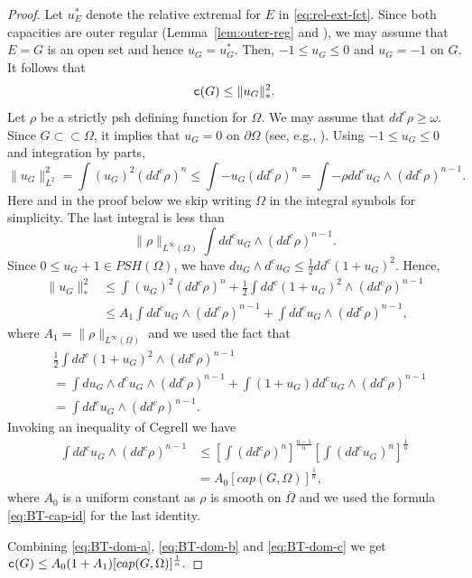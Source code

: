 \documentclass{amsart}
\renewcommand{\d}{\partial}
\newcommand{\om}{\omega}
\newcommand{\tc}{{\tt c}}
\newcommand{\Om}{\Omega}
\theoremstyle{definition}
\numberwithin{thm}{section}
\numberwithin{equation}{section}
\renewcommand{\[}{\begin{equation}}
\renewcommand{\]}{\end{equation}}
\newcommand{\wed}{\wedge}
\begin{document}
\begin{proof} Let  $u_E^*$ denote  the relative extremal for $E$ in \eqref{eq:rel-ext-fct}.
Since both capacities are outer regular (Lemma~\ref{lem:outer-reg} and \cite{BT82}), we may assume that $E=G$ is an open set and hence $u_G = u_G^*$. Then, $-1\leq u_G \leq 0$ and $u_G =-1$ on $G$.  It follows that
\[\label{eq:BT-dom-a}
	\tc(G) \leq \|u_G\|_*^2.
\]
Let $\rho$ be a strictly psh defining function for $\Om$. We may assume that $dd^c \rho \geq \om$. Since $G\subset \subset \Om$, it implies that $u_G =0$ on $\d\Om$ (see, e.g., \cite[Properties (13.11)]{De89}). Using  $-1 \leq u_G \leq 0$ and integration by parts,
$$
	\|u_G\|_{L^2}^2 = \int  (u_G)^2 (dd^c \rho)^n \leq \int - u_G (dd^c\rho)^n = \int -\rho dd^c u_G \wed (dd^c\rho)^{n-1}.
$$
Here and in the proof below we skip writing $\Om$ in the integral symbols 
for simplicity. The last integral is less than 
$$
	\|\rho\|_{L^\infty(\Om)} \int dd^c u_G \wed (dd^c\rho)^{n-1}.
$$
Since $0\leq u_G+1 \in PSH(\Om)$, we have
$d u_G \wed d^c u_G \leq \frac{1}{2} dd^c (1+u_G)^2.$
Hence, 
\[\label{eq:BT-dom-b}\begin{aligned}
	\|u_G\|_*^2 
&\leq \int (u_G)^2 (dd^c \rho)^n + \frac{1}{2}\int dd^c (1+u_G)^2 \wed (dd^c \rho)^{n-1} \\
&\leq A_1 \int dd^c u_G \wed (dd^c\rho)^{n-1} + \int dd^c u_G \wed (dd^c \rho)^{n-1},
\end{aligned}\]
where $A_1 = \|\rho\|_{L^\infty(\Om)}$ and we used the fact that 
$$\begin{aligned}
&	\frac{1}{2}\int dd^c (1+u_G)^2 \wed (dd^c \rho)^{n-1} \\
&=\int du_G \wed d^c u_G \wed (dd^c\rho)^{n-1} + \int (1+u_G) dd^c u_G \wed (dd^c \rho)^{n-1} \\
	&=	\int dd^c u_G \wed (dd^c \rho)^{n-1}.
\end{aligned}
$$
Invoking an inequality of Cegrell  \cite{Ce04} we have
\[\label{eq:BT-dom-c}\begin{aligned}
	\int dd^c u_G \wed (dd^c \rho)^{n-1}& \leq \left[\int (dd^c\rho)^n\right]^\frac{n-1}{n} \left[\int (dd^c u_G)^n\right]^\frac{1}{n} \\ &=  A_0 [cap(G,\Om)]^\frac{1}{n},
\end{aligned}\]
where $A_0$ is a uniform constant as $\rho$ is smooth on $\bar\Om$ and we used the formula \eqref{eq:BT-cap-id} for the last identity.

Combining \eqref{eq:BT-dom-a}, \eqref{eq:BT-dom-b} and \eqref{eq:BT-dom-c} we get $\tc (G) \leq A_0(1 + A_1) [cap(G,\Om)]^\frac{1}{n}.
$
\end{proof}
\end{document}
